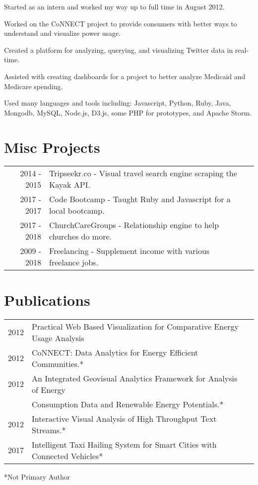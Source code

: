 \documentclass[]{deedy-resume-openfont}
\begin{document}
\begin{minipage}[t]{0.66\textwidth}
\begin{tightemize}
\item Started as an intern and worked my way up to full time in August 2012.
\item Worked on the CoNNECT project to provide consumers with better ways to understand and visualize power usage.
\item Created a platform for analyzing, querying, and visualizing Twitter data in real-time.
\item Assisted with creating dashboards for a project to better analyze Medicaid and Medicare spending.
\item Used many languages and tools including: Javascript, Python, Ruby, Java, Mongodb, MySQL, Node.js, D3.js, some PHP for prototypes, and Apache Storm.
\end{tightemize}
\sectionsep


\section{Misc Projects}

\begin{tabular}{rll}
2014 - 2015& Tripseekr.co - Visual travel search engine scraping the Kayak API.\\
2017 - 2017 & Code Bootcamp - Taught Ruby and Javascript for a local bootcamp.\\
2017 - 2018& ChurchCareGroups - Relationship engine to help churches do more.\\
2009 - 2018& Freelancing - Supplement income with various freelance jobs.\\
\end{tabular}
\sectionsep


\section{Publications}

\begin{tabular}{rll}
2012& Practical Web Based Visualization for Comparative Energy Usage Analysis\\
2012& CoNNECT: Data Analytics for Energy Efficient Communities.*\\
2012& An Integrated Geovisual Analytics Framework for Analysis of Energy\\
&Consumption Data and Renewable Energy Potentials.*\\
2012& Interactive Visual Analysis of High Throughput Text Streams.*\\
2017& Intelligent Taxi Hailing System for Smart Cities with Connected Vehicles*
\end{tabular}
*Not Primary Author
\sectionsep

\end{minipage}
\end{document}
